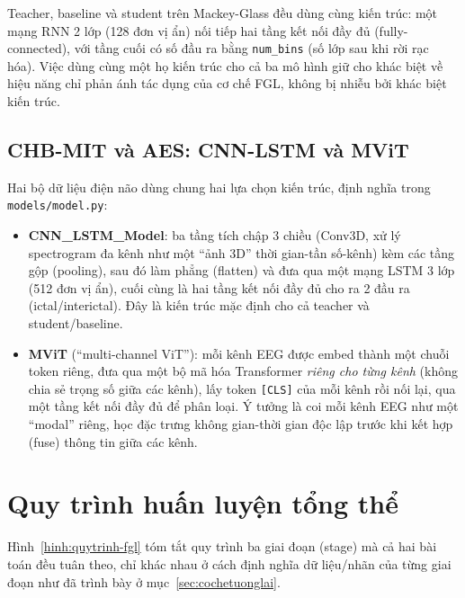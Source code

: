 Teacher, baseline và student trên Mackey-Glass đều dùng cùng kiến trúc: một mạng RNN 2 lớp
(128 đơn vị ẩn) nối tiếp hai tầng kết nối đầy đủ (fully-connected), với tầng cuối có số đầu ra
bằng \texttt{num\_bins} (số lớp sau khi rời rạc hóa). Việc dùng cùng một họ kiến trúc cho cả
ba mô hình giữ cho khác biệt về hiệu năng chỉ phản ánh tác dụng của cơ chế FGL, không bị nhiễu
bởi khác biệt kiến trúc.

\subsection{CHB-MIT và AES: CNN-LSTM và MViT}

Hai bộ dữ liệu điện não dùng chung hai lựa chọn kiến trúc, định nghĩa trong
\texttt{models/model.py}:

\begin{itemize}
	\item \textbf{CNN\_LSTM\_Model}: ba tầng tích chập 3 chiều (Conv3D, xử lý spectrogram đa
	kênh như một ``ảnh 3D'' thời gian-tần số-kênh) kèm các tầng gộp (pooling), sau đó làm
	phẳng (flatten) và đưa qua một mạng LSTM 3 lớp (512 đơn vị ẩn), cuối cùng là hai tầng kết
	nối đầy đủ cho ra 2 đầu ra (ictal/interictal). Đây là kiến trúc mặc định cho cả teacher và
	student/baseline.
	\item \textbf{MViT} (``multi-channel ViT''): mỗi kênh EEG được embed thành một chuỗi token
	riêng, đưa qua một bộ mã hóa Transformer \textit{riêng cho từng kênh} (không chia sẻ trọng
	số giữa các kênh), lấy token \texttt{[CLS]} của mỗi kênh rồi nối lại, qua một tầng kết nối
	đầy đủ để phân loại. Ý tưởng là coi mỗi kênh EEG như một ``modal'' riêng, học đặc trưng
	không gian-thời gian độc lập trước khi kết hợp (fuse) thông tin giữa các kênh.
\end{itemize}


\section{Quy trình huấn luyện tổng thể}
\label{sec:quytrinh}

Hình~\ref{hinh:quytrinh-fgl} tóm tắt quy trình ba giai đoạn (stage) mà cả hai bài toán đều
tuân theo, chỉ khác nhau ở cách định nghĩa dữ liệu/nhãn của từng giai đoạn như đã trình bày ở
mục~\ref{sec:cochetuonglai}.

